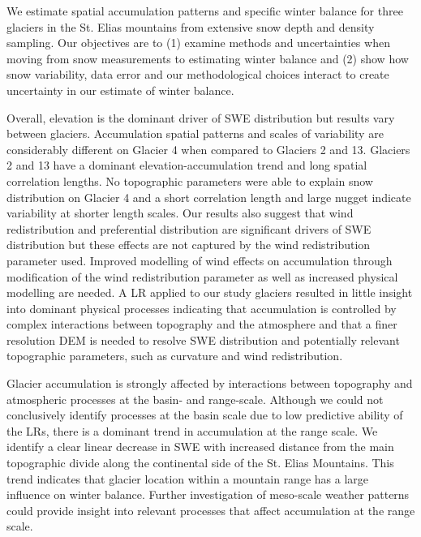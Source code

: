\documentclass[twocolumn, letterpaper]{igs}
\begin{document}
We estimate spatial accumulation patterns and specific winter balance for three glaciers in the St. Elias mountains from extensive snow depth and density sampling. Our objectives are to (1) examine methods and uncertainties when moving from snow measurements to estimating winter balance and (2) show how snow variability, data error and our methodological choices interact to create uncertainty in our estimate of winter balance.

Overall, elevation is the dominant driver of SWE distribution but results vary between glaciers. Accumulation spatial patterns and scales of variability are considerably different on Glacier 4 when compared to Glaciers 2 and 13. Glaciers 2 and 13 have a dominant elevation-accumulation trend and long spatial correlation lengths. No topographic parameters were able to explain snow distribution on Glacier 4 and a short correlation length and large nugget indicate variability at shorter length scales. Our results also suggest that wind redistribution and preferential distribution are significant drivers of SWE distribution but these effects are not captured by the wind redistribution parameter used. Improved modelling of wind effects on accumulation through modification of the wind redistribution parameter as well as increased physical modelling are needed. A LR applied to our study glaciers resulted in little insight into dominant physical processes indicating that accumulation is controlled by complex interactions between topography and the atmosphere and that a finer resolution DEM is needed to resolve SWE distribution and potentially relevant topographic parameters, such as curvature and wind redistribution.

Glacier accumulation is strongly affected by interactions between topography and atmospheric processes at the basin- and range-scale. Although we could not conclusively identify processes at the basin scale due to low predictive ability of the LRs, there is a dominant trend in accumulation at the range scale. We identify a clear linear decrease in SWE with increased distance from the main topographic divide along the continental side of the St. Elias Mountains. This trend indicates that glacier location within a mountain range has a large influence on winter balance. Further investigation of meso-scale weather patterns could provide insight into relevant processes that affect accumulation at the range scale.
\end{document}
